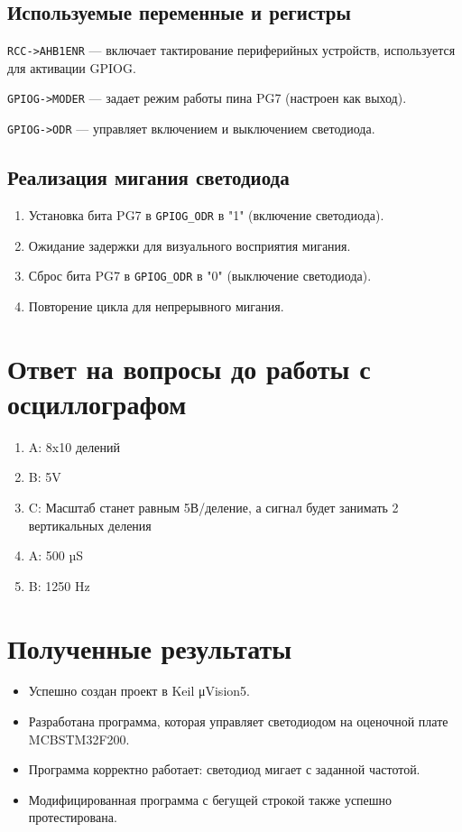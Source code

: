 \subsection{Используемые переменные и регистры}
\begin{description}
    \item \texttt{RCC->AHB1ENR} — включает тактирование периферийных устройств, используется для активации GPIOG.
    \item \texttt{GPIOG->MODER} — задает режим работы пина PG7 (настроен как выход).
    \item \texttt{GPIOG->ODR} — управляет включением и выключением светодиода.
\end{description}

\subsection{Реализация мигания светодиода}
\begin{enumerate}
    \item Установка бита PG7 в \texttt{GPIOG\_ODR} в "1" (включение светодиода).
    \item Ожидание задержки для визуального восприятия мигания.
    \item Сброс бита PG7 в \texttt{GPIOG\_ODR} в "0" (выключение светодиода).
    \item Повторение цикла для непрерывного мигания.
\end{enumerate}

\section{Ответ на вопросы до работы с осциллографом}
\begin{enumerate}
	\item A: 8x10 делений
	\item B: 5V
	\item C: Масштаб станет равным 5В/деление, а сигнал будет занимать 2 вертикальных деления
	\item A: 500 µS
	\item B: 1250 Hz
\end{enumerate}

\section{Полученные результаты}
\begin{itemize}
	\item Успешно создан проект в Keil μVision5.
	\item Разработана программа, которая управляет светодиодом на оценочной плате MCBSTM32F200.
	\item Программа корректно работает: светодиод мигает с заданной частотой.
	\item Модифицированная программа с бегущей строкой также успешно протестирована.
\end{itemize}




